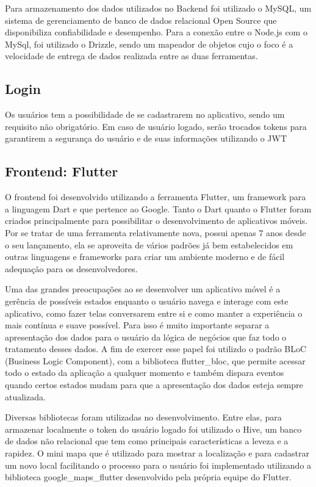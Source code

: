 \documentclass[12pt]{article}
\begin{document}
Para armazenamento dos dados utilizados no Backend foi utilizado o MySQL, um sistema de gerenciamento de banco de dados relacional Open Source que disponibiliza confiabilidade e desempenho. Para a conexão entre o Node.js com o MySql, foi utilizado o Drizzle, sendo um mapeador de objetos cujo o foco é a velocidade de entrega de dados realizada entre as duas ferramentas.

\subsection{Login}
Os usuários tem a possibilidade de se cadastrarem no aplicativo, sendo um requisito não obrigatório. Em caso de usuário logado, serão trocados tokens para garantirem a segurança do usuário e de suas informações utilizando o JWT

\subsection{Frontend: Flutter}
O frontend foi desenvolvido utilizando a ferramenta Flutter, um framework para a linguagem Dart e que pertence ao Google. Tanto o Dart quanto o Flutter foram criados principalmente para possibilitar o desenvolvimento de aplicativos móveis. Por se tratar de uma ferramenta relativamente nova, possui apenas 7 anos desde o seu lançamento, ela se aproveita de vários padrões já bem estabelecidos em outras linguagens e frameworks para criar um ambiente moderno e de fácil adequação para os desenvolvedores.

Uma das grandes preocupações ao se desenvolver um aplicativo móvel é a gerência de possíveis estados enquanto o usuário navega e interage com este aplicativo, como fazer telas conversarem entre si e como manter a experiência o mais contínua e suave possível. Para isso é muito importante separar a apresentação dos dados para o usuário da lógica de negócios que faz todo o tratamento desses dados. A fim de exercer esse papel foi utilizdo o padrão BLoC (Business Logic Component), com a biblioteca flutter\_bloc, que permite acessar todo o estado da aplicação a qualquer momento e também dispara eventos quando certos estados mudam para que a apresentação dos dados esteja sempre atualizada.

Diversas bibliotecas foram utilizadas no desenvolvimento. Entre elas, para armazenar localmente o token do usuário logado foi utilizado o Hive, um banco de dados não relacional que tem como principais características a leveza e a rapidez. O mini mapa que é utilizado para mostrar a localização e para cadastrar um novo local facilitando o processo para o usuário foi implementado utilizando a biblioteca google\_maps\_flutter desenvolvido pela própria equipe do Flutter. 
\end{document}
